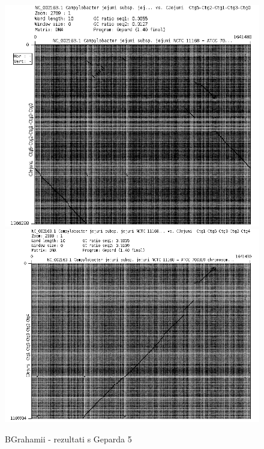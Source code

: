 \begin{figure}[H]
    \centering
    \includegraphics[scale=0.5]{img/Grah9.png}    \includegraphics[scale=0.5]{img/Grah6.png}
    \caption{BGrahamii - rezultati s Geparda 5}
    \label{fig:grahmi5}
\end{figure}
